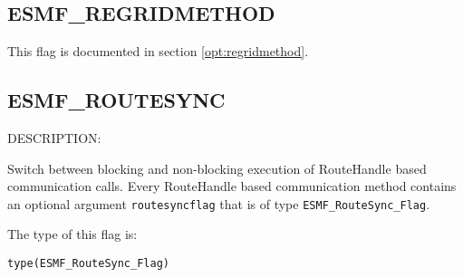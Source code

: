 \subsection{ESMF\_REGRIDMETHOD}
This flag is documented in section \ref{opt:regridmethod}.

\subsection{ESMF\_ROUTESYNC}
\label{const:routesync}
{\sf DESCRIPTION:\\}  
\begin{sloppypar}
Switch between blocking and non-blocking execution of RouteHandle based
communication calls. Every RouteHandle based communication method contains
an optional argument {\tt routesyncflag} that is of type {\tt ESMF\_RouteSync\_Flag}.
\end{sloppypar}

The type of this flag is:

{\tt type(ESMF\_RouteSync\_Flag)}

